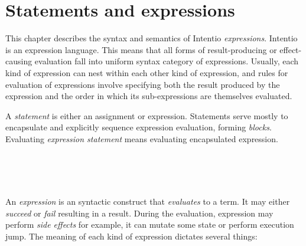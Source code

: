 \chapter{Statements and expressions}

This chapter describes the syntax and semantics of Intentio \emph{expressions}. Intentio is an expression language. This means that all forms of result-producing or effect-causing evaluation fall into uniform syntax category of expressions. Usually, each kind of expression can nest within each other kind of expression, and rules for evaluation of expressions involve specifying both the result produced by the expression and the order in which its sub-expressions are themselves evaluated.

A \emph{statement} is either an assignment or expression. Statements serve mostly to encapsulate and explicitly sequence expression evaluation, forming \emph{blocks}. Evaluating \emph{expression statement} means evaluating encapsulated expression.

\begin{bnf}
   \eq    {}  
            \gorln {}     \\
  \\
   \eq    {}                      
            \gorln {}                 
            \gorln {}              
            \gorln {}                    
            \gorln {}                   
            \gorln \term{(} \  \ \term{)}  
            \gorln {}                    
            \gorln {}                   
            \gorln {}                      
            \gorln {}                  
\end{bnf}

An \emph{expression} is an syntactic construct that \emph{evaluates} to a term. It may either \emph{succeed} or \emph{fail} resulting in a result. During the evaluation, expression may perform \emph{side effects} for example, it can mutate some state or perform execution jump. The meaning of each kind of expression dictates several things:

